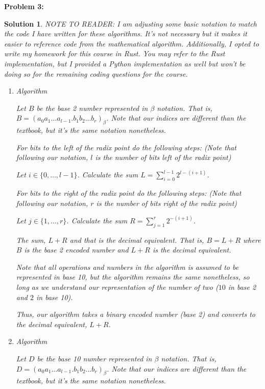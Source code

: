 \documentclass[12pt, letterpaper]{article}
\theoremstyle{nonumberplain}
\newtheorem{sol}{Solution}
\begin{document}
\newpage

\hspace{18pt}\textbf{Problem 3:} \medskip
\begin{sol}
	NOTE TO READER: I am adjusting some basic notation to match the code I have written for these algorithms. It's not necessary but it makes it easier to reference code from the mathematical algorithm. Additionally, I opted to write my homework for this course in Rust. You may refer to the Rust implementation, but I provided a Python implementation as well but won't be doing so for the remaining coding questions for the course.
	\begin{enumerate}[label=\alph*)]
		\item Algorithm

		      Let $B$ be the base 2 number represented in $\beta$ notation. That is, $B = (a_0 a_1 \ldots a_{l-1}.b_1 b_2 \ldots b_r)_\beta$. Note that our indices are different than the textbook, but it's the same notation nonetheless.

		      For bits to the left of the radix point do the following steps: (Note that following our notation, $l$ is the number of bits left of the radix point)

		      Let $i\in \{0, \ldots, l-1\}$. Calculate the sum $L = \sum_{i=0}^{l-1}2^{l - (i+1)}$.

		      For bits to the right of the radix point do the following steps: (Note that following our notation, $r$ is the number of bits right of the radix point)

		      Let $j\in \{1, \ldots, r\}$. Calculate the sum $R = \sum_{j=1}^r 2^{-(i+1)}$.

		      The sum, $L+R$ and that is the decimal equivalent. That is, $B = L+R$ where $B$ is the base 2 encoded number and $L+R$ is the decimal equivalent.

		      Note that all operations and numbers in the algorithm is assumed to be represented in base 10, but the algorithm remains the same nonetheless, so long as we understand our representation of the number of two ($10$ in base 2 and $2$ in base 10).

		      Thus, our algorithm takes a binary encoded number (base 2) and converts to the decimal equivalent, $L+R$.


		\item Algorithm

		      Let $D$ be the base 10 number represented in $\beta$ notation. That is, $D = (a_0 a_1 \ldots a_{l-1}.b_1 b_2 \ldots b_r)_\beta$. Note that our indices are different than the textbook, but it's the same notation nonetheless.


\end{enumerate}
\end{sol}
\end{document}
